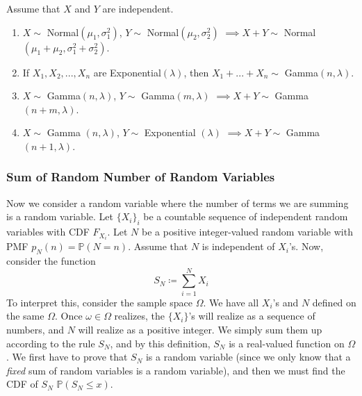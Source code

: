     \begin{theorem}
      Assume that $X$ and $Y$ are independent. 
      \begin{enumerate}
        \item $X \sim$ Normal$(\mu_1, \sigma_1^2)$, $Y \sim$ Normal$(\mu_2, \sigma_2^2)$ $\implies X + Y \sim$ Normal $(\mu_1 + \mu_2, \sigma_1^2 + \sigma_2^2)$. 
        \item If $X_1, X_2, ..., X_n$ are Exponential$(\lambda)$, then $X_1 + ... + X_n \sim$ Gamma$(n, \lambda)$.
        \item $X \sim$ Gamma$(n, \lambda)$, $Y \sim$ Gamma$(m, \lambda)$ $\implies X + Y \sim$ Gamma$(n + m, \lambda)$. 
        \item $X \sim$ Gamma $(n, \lambda)$, $Y \sim$ Exponential $(\lambda)$ $\implies X + Y \sim$ Gamma$(n+1, \lambda)$. 
      \end{enumerate}
    \end{theorem}

  \subsubsection{Sum of Random Number of Random Variables}

    Now we consider a random variable where the number of terms we are summing is a random variable. Let $\{X_i\}_i$ be a countable sequence of independent random variables with CDF $F_{X_i}$. Let $N$ be a positive integer-valued random variable with PMF $p_N(n) = \mathbb{P}(N = n)$. Assume that $N$ is independent of $X_i$'s. Now, consider the function 
    \begin{equation}
      S_N \coloneqq \sum_{i=1}^N X_i
    \end{equation}
    To interpret this, consider the sample space $\Omega$. We have all $X_i$'s and $N$ defined on the same $\Omega$. Once $\omega \in \Omega$ realizes, the $\{X_i\}$'s will realize as a sequence of numbers, and $N$ will realize as a positive integer. We simply sum them up according to the rule $S_N$, and by this definition, $S_N$ is a real-valued function on $\Omega$. We first have to prove that $S_N$ is a random variable (since we only know that a \textit{fixed} sum of random variables is a random variable), and then we must find the CDF of $S_N$ $\mathbb{P}(S_N \leq x)$. 

